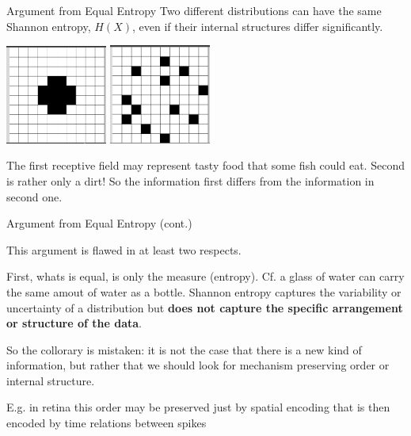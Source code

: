 \documentclass[10pt, aspectratio=169, handout]{beamer}
\begin{document}
\begin{frame}[label=equal_entropy]{Argument from Equal Entropy}
  Two different distributions can have the same Shannon entropy, $H(X)$, even if their internal structures differ significantly. 

\begin{center}
    \includegraphics[width=0.25\textwidth]{images/entropia_1.png}
    \includegraphics[width=0.25\textwidth]{images/entropia_2.png}
\end{center}
   The first receptive field may represent tasty food that some  fish could eat. Second is rather only a dirt! So the information first differs from the information in second one.
\end{frame}

\begin{frame}[label=equal_entropy_cont]{Argument from Equal Entropy (cont.)}    
       
This argument is flawed in at least two respects.

First, whats is equal, is only the measure (entropy). Cf. a glass of water can carry the same amout of water as a bottle.    Shannon entropy captures the variability or uncertainty of a distribution but \textbf{does not capture the specific arrangement or structure of the data}.


    So the collorary is mistaken: it is not the case that there is a new kind of information, but rather that we should look for mechanism preserving order  or internal structure.

    E.g. in retina this order may be preserved just by spatial encoding that is then encoded by time relations between spikes

   


\end{frame}
\end{document}
